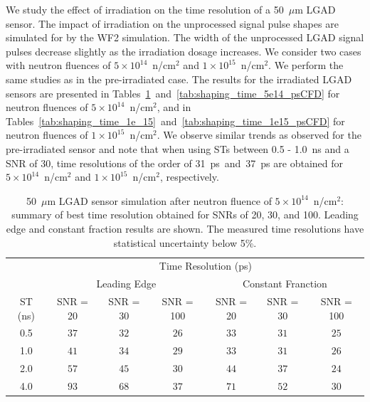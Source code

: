 \documentclass[preprint,1p]{elsarticle}
\begin{document}
We study the effect of irradiation on the time resolution of a 50~$\mu$m LGAD sensor. The impact of irradiation on the unprocessed signal pulse shapes are simulated for by the WF2 simulation. The width of the unprocessed
LGAD signal pulses decrease slightly as the irradiation dosage increases. We consider two
cases with neutron fluences of $5\times 10^{14}$~n/cm$^2$ and
$1\times 10^{15}$~n/cm$^2$. We perform the same studies as in the pre-irradiated case.
The results for the irradiated LGAD sensors are presented in
Tables~\ref{tab:shaping_time_5e14}~and~\ref{tab:shaping_time_5e14_psCFD} for
neutron fluences of $5\times 10^{14}$~n/cm$^2$, and in
Tables~\ref{tab:shaping_time_1e_15}~and~\ref{tab:shaping_time_1e15_psCFD} for neutron
fluences of $1\times 10^{15}$~n/cm$^2$.
We observe similar trends as observed for the pre-irradiated sensor and note that when
using STs between 0.5 - 1.0~\si{ns} and a SNR of 30, time resolutions of the order
of 31~\si{ps}~and~37~\si{ps} are obtained for $5\times 10^{14}$~n/cm$^2$ and
$1\times 10^{15}$~n/cm$^2$, respectively.





 \begin{table}
     \begin{tabular}{c|ccc|ccc}
     \multicolumn{1}{c}{}& \multicolumn{6}{c}{Time Resolution (ps)} \\
     \multicolumn{1}{c}{}&\multicolumn{3}{c}{Leading Edge} & \multicolumn{3}{c}{Constant Franction}\\ \hline
     ST (ns) & SNR = 20   & SNR = 30      & SNR = 100     & SNR = 20      & SNR = 30      & SNR = 100 \\
     0.5 & $37$  & $32$  & $26$  & $33$  & $31$  & $25$ \\
     1.0 & $41$  & $34$  & $29$  & $33$  & $31$  & $26$ \\
     2.0 & $57$  & $45$  & $30$  & $44$  & $37$  & $24$ \\
     4.0 & $93$  & $68$  & $37$  & $71$  & $52$  & $30$ \\
     \end{tabular}
     \caption{50~$\mu$m LGAD sensor simulation after neutron fluence of
      $5\times 10^{14}$~n/cm$^2$: summary of best time resolution obtained for SNRs
     of 20, 30, and 100. Leading edge and constant fraction results are shown. The measured time resolutions
    have statistical uncertainty below 5\%.}
\label{tab:shaping_time_5e14}
  \end{table}
\end{document}

